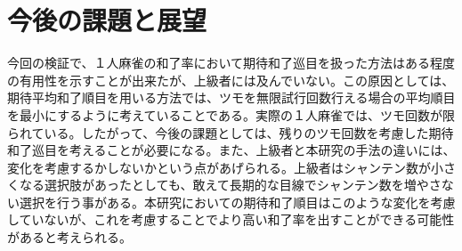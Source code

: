 \section{今後の課題と展望}
今回の検証で、１人麻雀の和了率において期待和了巡目を扱った方法はある程度の有用性を示すことが出来たが、上級者には及んでいない。この原因としては、期待平均和了順目を用いる方法では、ツモを無限試行回数行える場合の平均順目を最小にするように考えていることである。実際の１人麻雀では、ツモ回数が限られている。したがって、今後の課題としては、残りのツモ回数を考慮した期待和了巡目を考えることが必要になる。また、上級者と本研究の手法の違いには、変化を考慮するかしないかという点があげられる。上級者はシャンテン数が小さくなる選択肢があったとしても、敢えて長期的な目線でシャンテン数を増やさない選択を行う事がある。本研究においての期待和了順目はこのような変化を考慮していないが、これを考慮することでより高い和了率を出すことができる可能性があると考えられる。

\nocite{*}